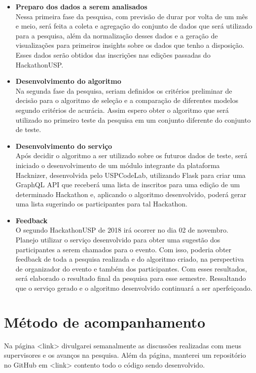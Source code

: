 \documentclass[10pt,twoside,a4paper]{article}
\begin{document}
  \begin{itemize}
    \item \textbf{Preparo dos dados a serem analisados} \\
        Nessa primeira fase da pesquisa, com previsão de durar por volta de um mês e meio, será feita a coleta e agregação do conjunto de dados que será utilizado para a pesquisa, além da normalização desses dados e a geração de visualizações para primeiros insights sobre os dados que tenho a disposição. Esses dados serão obtidos das inscrições nas edições passadas do HackathonUSP.
    
    \item \textbf{Desenvolvimento do algoritmo} \\
        Na segunda fase da pesquisa, seriam definidos os critérios preliminar de decisão para o algoritmo de seleção e a comparação de diferentes modelos segundo critérios de acurácia. Assim espero obter o algoritmo que será utilizado no primeiro teste da pesquisa em um conjunto diferente do conjunto de teste.
          
    \item \textbf{Desenvolvimento do serviço} \\
        Após decidir o algoritmo a ser utilizado sobre os futuros dados de teste, será iniciado o desenvolvimento de um módulo integrante da plataforma Hacknizer, desenvolvida pelo USPCodeLab, utilizando Flask para criar uma GraphQL API que receberá uma lista de inscritos para uma edição de um determinado Hackathon e, aplicando o algoritmo desenvolvido, poderá gerar uma lista sugerindo os participantes para tal Hackathon. 
    
    \item \textbf{Feedback} \\
        O segundo HackathonUSP de 2018 irá ocorrer no dia 02 de novembro. Planejo utilizar o serviço desenvolvido para obter uma sugestão dos participantes a serem chamados para o evento. Com isso, poderia obter feedback de toda a pesquisa realizada e do algoritmo criado, na perspectiva de organizador do evento e também dos participantes. Com esses resultados, será elaborado o resultado final da pesquisa para esse semestre. Ressaltando que o serviço gerado e o algoritmo desenvolvido continuará a ser aperfeiçoado.

  \end{itemize}

\section{Método de acompanhamento}

    Na página <link> divulgarei semanalmente as discussões realizadas com meus supervisores e os avanços na pesquisa. Além da página, manterei um repositório no GitHub em <link> contento todo o código sendo desenvolvido.
\end{document}
